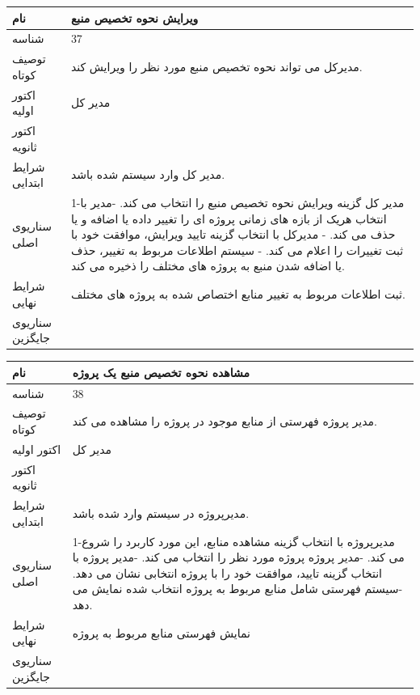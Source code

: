 \documentclass{article}
\begin{document}
\vspace{2cm}

\begin{tabular}{|p{2cm}|p{10cm}|}
\hline
نام
&
ویرایش نحوه تخصیص منبع
\\
\hline
شناسه
&
37
\\
\hline
توصیف کوتاه
&
مدیرکل می تواند نحوه تخصیص منبع مورد نظر را ویرایش کند. 
\\
\hline
اکتور اولیه
&
مدیر کل
\\
\hline
اکتور ثانویه
&

\\
\hline
شرایط ابتدایی
&
مدیر کل وارد سیستم شده باشد.
\\
\hline
سناریوی اصلی
&
1-مدیر کل گزینه ویرایش نحوه تخصیص منبع را انتخاب می کند.
\newline
2-مدیر با انتخاب هریک از بازه های زمانی پروژه ای را تغییر داده یا اضافه و یا حذف می کند.
\newline
3- مدیرکل با انتخاب گزینه تایید ویرایش، موافقت خود با ثبت تغییرات را اعلام می کند.
\newline
4- سیستم اطلاعات مربوط به تغییر، حذف یا اضافه شدن منبع به پروژه های مختلف را ذخیره می کند.  
\\
\hline
شرایط نهایی
&
ثبت اطلاعات مربوط به تغییر منابع اختصاص شده به پروژه های مختلف.
\\
\hline
سناریوی جایگزین
&

\\
\hline
\end{tabular}

\vspace{2cm}

\begin{tabular}{|p{2cm}|p{10cm}|}
\hline
نام
&
مشاهده نحوه تخصیص منبع یک پروژه
\\
\hline
شناسه
&
38
\\
\hline
توصیف کوتاه
&
مدیر پروژه فهرستی از منابع موجود در پروژه را مشاهده می کند.
\\
\hline
اکتور اولیه
&
مدیر کل
\\
\hline
اکتور ثانویه
&

\\
\hline
شرایط ابتدایی
&
مدیرپروژه در سیستم وارد شده باشد.
\\
\hline
سناریوی اصلی
&
1-مدیرپروژه با انتخاب گزینه مشاهده منابع، این مورد کاربرد را شروع می کند.
\newline
2-مدیر پروژه پروژه مورد نظر را انتخاب می کند.
\newline
3-مدیر پروژه با انتخاب گزینه تایید، موافقت خود را با پروژه انتخابی نشان می دهد.
\newline
4-سیستم فهرستی شامل منابع مربوط به پروژه انتخاب شده نمایش می دهد.
\\
\hline
شرایط نهایی
&
نمایش فهرستی منابع مربوط به پروژه
\\
\hline
سناریوی جایگزین
&

\\
\hline
\end{tabular}
\end{document}
